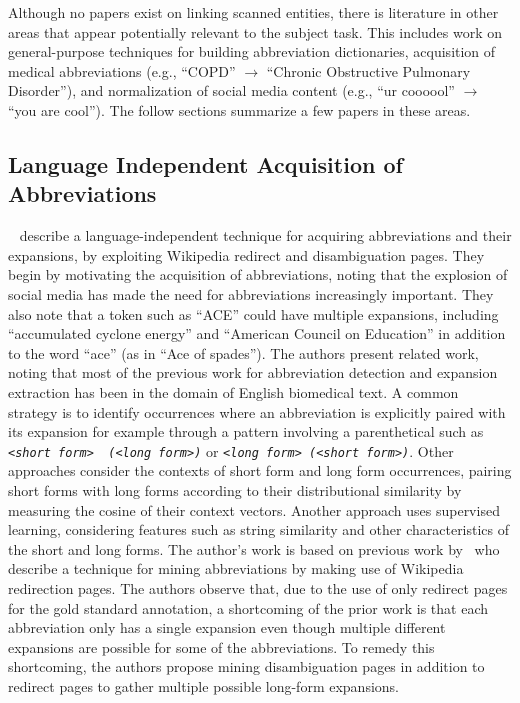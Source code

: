 \documentclass[11pt,a4paper]{article}
\begin{document}
Although no papers exist on linking scanned entities, there is
literature in other areas that appear potentially relevant to the
subject task.  This includes work on general-purpose techniques for
building abbreviation dictionaries, acquisition of medical
abbreviations (e.g., ``COPD'' $\rightarrow$ ``Chronic Obstructive Pulmonary
Disorder''), and normalization of social media content (e.g., ``ur
coooool'' $\rightarrow$ ``you are cool'').  The follow sections
summarize a few papers in these areas.

\subsection{Language Independent Acquisition of Abbreviations}
~\cite{DBLP:journals/corr/abs-1709-08074} describe a
language-independent technique for acquiring abbreviations and their
expansions, by exploiting Wikipedia redirect and disambiguation pages.
They begin by motivating the acquisition of abbreviations, noting that
the explosion of social media has made the need for abbreviations
increasingly important.  They also note that a token such as ``ACE''
could have multiple expansions, including ``accumulated cyclone
energy'' and ``American Council on Education'' in addition to the word
``ace'' (as in ``Ace of spades''). 
The authors present related work, noting that most of the previous
work for abbreviation detection and expansion extraction has been in
the domain of English biomedical text.  A common strategy is to
identify occurrences where an abbreviation is explicitly paired with
its expansion for example through a pattern involving a parenthetical
such as {\em \verb|<short form>  (<long form>)|} or {\em
  \verb|<long form> (<short form>)|}.
Other approaches consider the contexts of short form and long form
occurrences, pairing short forms with long forms according to their
distributional similarity by measuring the cosine of their context
vectors.  Another approach uses supervised learning, considering
features such as string similarity and other characteristics of the
short and long forms. 
The author’s work is based on previous work by~\cite{JACQUET14.468} who describe a technique for mining abbreviations by making use of Wikipedia redirection pages.  The authors observe that, due to the use of only redirect pages for the gold standard annotation, a shortcoming of the prior work is that each abbreviation only has a single expansion even though multiple different expansions are possible for some of the abbreviations.  To remedy this shortcoming, the authors propose mining disambiguation pages in addition to redirect pages to gather multiple possible long-form expansions.
\end{document}

